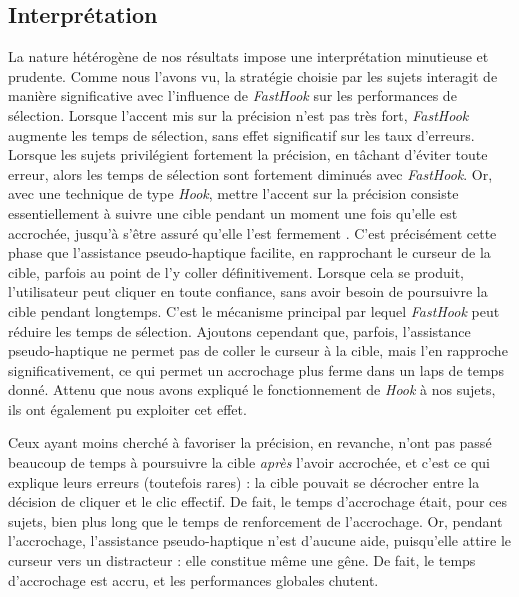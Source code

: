 	\subsection{Interprétation}
	La nature hétérogène de nos résultats impose une interprétation minutieuse et prudente. Comme nous l'avons vu, la stratégie choisie par les sujets interagit de manière significative avec l'influence de \emph{FastHook} sur les performances de sélection. Lorsque l'accent mis sur la précision n'est pas très fort, \emph{FastHook} augmente les temps de sélection, sans effet significatif sur les taux d'erreurs. Lorsque les sujets privilégient fortement la précision, en tâchant d'éviter toute erreur, alors les temps de sélection sont fortement diminués avec \emph{FastHook}. Or, avec une technique de type \emph{Hook}, mettre l'accent sur la précision consiste essentiellement à suivre une cible pendant un moment une fois qu'elle est accrochée, jusqu'à s'être assuré qu'elle l'est \og fermement \fg{}. C'est précisément cette phase que l'assistance pseudo-haptique facilite, en rapprochant le curseur de la cible, parfois au point de l'y \og coller \fg{}  définitivement. Lorsque cela se produit, l'utilisateur peut cliquer en toute confiance, sans avoir besoin de poursuivre la cible pendant longtemps. C'est le mécanisme principal par lequel \emph{FastHook} peut réduire les temps de sélection. Ajoutons cependant que, parfois, l'assistance pseudo-haptique ne permet pas de coller le curseur à la cible, mais l'en rapproche significativement, ce qui permet un accrochage plus ferme dans un laps de temps donné. Attenu que nous avons expliqué le fonctionnement de \emph{Hook} à nos sujets, ils ont également pu exploiter cet effet.
	
	Ceux ayant moins cherché à favoriser la précision, en revanche, n'ont pas passé beaucoup de temps à poursuivre la cible \emph{après} l'avoir accrochée, et c'est ce qui explique leurs erreurs (toutefois rares) : la cible pouvait se décrocher entre la décision de cliquer et le clic effectif. De fait, le temps d'accrochage était, pour ces sujets, bien plus long que le temps de renforcement de l'accrochage. Or, pendant l'accrochage, l'assistance pseudo-haptique n'est d'aucune aide, puisqu'elle attire le curseur vers un distracteur : elle constitue même une gêne. De fait, le temps d'accrochage est accru, et les performances globales chutent.
	
